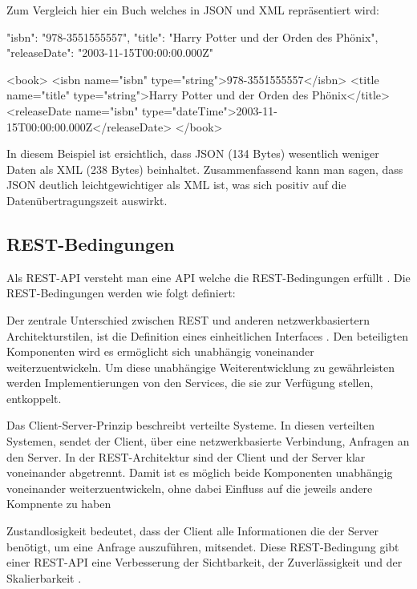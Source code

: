 Zum Vergleich hier ein Buch welches in JSON und XML repräsentiert wird:
\begin{JsCode}
{
    "isbn": "978-3551555557",
    "title": "Harry Potter und der Orden des Phönix",
    "releaseDate": "2003-11-15T00:00:00.000Z"
}
\end{JsCode}

\begin{XmlCode}
<book>
    <isbn name="isbn" type="string">978-3551555557</isbn>
    <title name="title" type="string">Harry Potter und der Orden des Phönix</title>
    <releaseDate name="isbn" type="dateTime">2003-11-15T00:00:00.000Z</releaseDate>
</book>
\end{XmlCode}

In diesem Beispiel ist ersichtlich, dass JSON (134 Bytes) wesentlich weniger Daten als XML (238 Bytes) beinhaltet.
Zusammenfassend kann man sagen, dass JSON deutlich leichtgewichtiger als XML ist, was sich positiv auf die Datenübertragungszeit auswirkt.

\subsection{REST-Bedingungen}
Als REST-API versteht man eine API welche die REST-Bedingungen erfüllt \cite[Abs. REST-APIs]{graphcms}.
Die REST-Bedingungen werden wie folgt definiert:

Der zentrale Unterschied zwischen REST und anderen netzwerkbasiertern Architekturstilen, ist die Definition eines einheitlichen Interfaces \cite[S.81]{fielding2000architectural}.
Den beteiligten Komponenten wird es ermöglicht sich unabhängig voneinander weiterzuentwickeln.
Um diese unabhängige Weiterentwicklung zu gewährleisten werden Implementierungen von den Services, die sie zur Verfügung stellen, entkoppelt.

Das Client-Server-Prinzip beschreibt verteilte Systeme.
In diesen verteilten Systemen, sendet der Client, über eine netzwerkbasierte Verbindung, Anfragen an den Server.
In der REST-Architektur sind der Client und der Server klar voneinander abgetrennt.
Damit ist es möglich beide Komponenten unabhängig voneinander weiterzuentwickeln, ohne dabei Einfluss auf die jeweils andere Kompnente zu haben

Zustandlosigkeit bedeutet, dass der Client alle Informationen die der Server benötigt, um eine Anfrage auszuführen, mitsendet.
Diese REST-Bedingung gibt einer REST-API eine Verbesserung der Sichtbarkeit, der Zuverlässigkeit und der Skalierbarkeit \cite[S. 79]{fielding2000architectural}.

